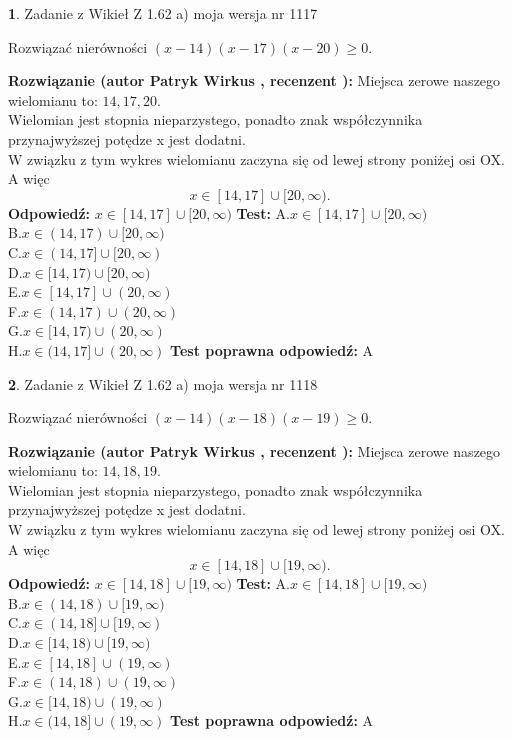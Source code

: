 \documentclass[12pt, a4paper]{article}
\theoremstyle{definition} %
\newtheorem{zad}{}
\newcommand{\zadStart}[1]{\begin{zad}#1\newline}
\newcommand{\zadStop}{\end{zad}}
\newcommand{\rozwStart}[2]{\noindent \textbf{Rozwiązanie (autor #1 , recenzent #2): }\newline}
\newcommand{\rozwStop}{\newline}
\newcommand{\odpStart}{\noindent \textbf{Odpowiedź:}\newline}
\newcommand{\odpStop}{\newline}
\newcommand{\testStart}{\noindent \textbf{Test:}\newline}
\newcommand{\testStop}{\newline}
\newcommand{\kluczStart}{\noindent \textbf{Test poprawna odpowiedź:}\newline}
\newcommand{\kluczStop}{\newline}
\begin{document}
\zadStart{Zadanie z Wikieł Z 1.62 a) moja wersja nr 1117}

Rozwiązać nierówności $(x-14)(x-17)(x-20)\ge0$.
\zadStop
\rozwStart{Patryk Wirkus}{}
Miejsca zerowe naszego wielomianu to: $14, 17, 20$.\\
Wielomian jest stopnia nieparzystego, ponadto znak współczynnika przy\linebreak najwyższej potędze x jest dodatni.\\ W związku z tym wykres wielomianu zaczyna się od lewej strony poniżej osi OX. A więc $$x \in [14,17] \cup [20,\infty).$$
\rozwStop
\odpStart
$x \in [14,17] \cup [20,\infty)$
\odpStop
\testStart
A.$x \in [14,17] \cup [20,\infty)$\\
B.$x \in (14,17) \cup [20,\infty)$\\
C.$x \in (14,17] \cup [20,\infty)$\\
D.$x \in [14,17) \cup [20,\infty)$\\
E.$x \in [14,17] \cup (20,\infty)$\\
F.$x \in (14,17) \cup (20,\infty)$\\
G.$x \in [14,17) \cup (20,\infty)$\\
H.$x \in (14,17] \cup (20,\infty)$
\testStop
\kluczStart
A
\kluczStop



\zadStart{Zadanie z Wikieł Z 1.62 a) moja wersja nr 1118}

Rozwiązać nierówności $(x-14)(x-18)(x-19)\ge0$.
\zadStop
\rozwStart{Patryk Wirkus}{}
Miejsca zerowe naszego wielomianu to: $14, 18, 19$.\\
Wielomian jest stopnia nieparzystego, ponadto znak współczynnika przy\linebreak najwyższej potędze x jest dodatni.\\ W związku z tym wykres wielomianu zaczyna się od lewej strony poniżej osi OX. A więc $$x \in [14,18] \cup [19,\infty).$$
\rozwStop
\odpStart
$x \in [14,18] \cup [19,\infty)$
\odpStop
\testStart
A.$x \in [14,18] \cup [19,\infty)$\\
B.$x \in (14,18) \cup [19,\infty)$\\
C.$x \in (14,18] \cup [19,\infty)$\\
D.$x \in [14,18) \cup [19,\infty)$\\
E.$x \in [14,18] \cup (19,\infty)$\\
F.$x \in (14,18) \cup (19,\infty)$\\
G.$x \in [14,18) \cup (19,\infty)$\\
H.$x \in (14,18] \cup (19,\infty)$
\testStop
\kluczStart
A
\kluczStop
\end{document}

